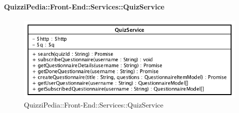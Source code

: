\paragraph{QuizziPedia::Front-End::Services::QuizService}
\begin{figure}[ht]
	\centering
	\includegraphics[scale=0.60]{UML/Classi/Front-End/QuizziPedia_Front-end_Services_QuizService.png}
	\caption{QuizziPedia::Front-End::Services::QuizService}
\end{figure}\FloatBarrier
